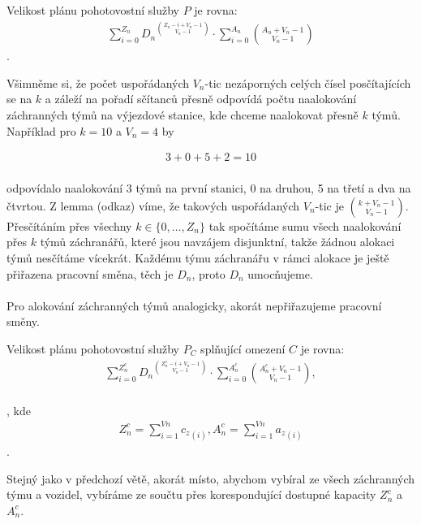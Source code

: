 \begin{veta}
  Velikost plánu pohotovostní služby $P$ je rovna:
  \begin{align}
    \sum_{i = 0}^{Z_n} {D_n}^{\binom{Z_n - i + V_n - 1}{V_n - 1}} \cdot \sum_{i = 0}^{A_n} {\binom{A_n + V_n - 1}{V_n - 1}}
  \end{align}
  .
\end{veta}
\begin{dukaz}
  Všimněme si, že počet uspořádaných $V_n$-tic nezáporných celých čísel posčítajících se na $k$
  a záleží na pořadí sčítanců přesně odpovídá počtu naalokování záchranných týmů na výjezdové stanice, kde chceme naalokovat přesně $k$ týmů.
  Například pro $k = 10$ a $V_n = 4$ by

  \begin{align*}
    3 + 0 + 5 + 2 = 10
    \\
  \end{align*}

  odpovídalo naalokování 3 týmů na první stanici, 0 na druhou, 5 na třetí a dva na čtvrtou.
  Z lemma (odkaz) víme, že takových uspořádaných $V_n$-tic je $\binom{k + V_n - 1}{V_n - 1}$.
  Přesčítáním přes všechny $k \in \{ 0, \dots, Z_n \}$ tak spočítáme sumu všech naalokování přes $k$ týmů záchranářů, které jsou navzájem disjunktní, takže žádnou alokaci týmů nesčítáme vícekrát.
  Každému týmu záchranářu v rámci alokace je ještě přiřazena pracovní směna, těch je $D_n$, proto $D_n$ umocňujeme. 
  \\
  \\
  Pro alokování záchranných týmů analogicky, akorát nepřiřazujeme pracovní směny.

\end{dukaz}

\begin{veta}
  Velikost plánu pohotovostní služby $P_C$ splňující omezení $C$ je rovna:
  \begin{align}
    \sum_{i=0}^{Z^c_n}{{D_n}^{\binom{Z^c_n - i + V_n - 1}{V_n - 1}}} \cdot \sum_{i = 0}^{A^c_n}\binom{A^c_n + V_n - 1}{V_n - 1},
  \end{align}
  \\
  , kde
  \begin{align}
    Z^c_n = \sum_{i=1}^{Vn} {c_z}_{(i)}, A^c_n = \sum_{i=1}^{Vn} {a_z}_{(i)}
  \end{align}
  .
  \\
\end{veta}
\begin{dukaz}
  Stejný jako v předchozí větě, akorát místo, abychom vybíral ze všech záchranných týmu a vozidel, vybíráme ze součtu přes korespondující dostupné kapacity $Z^c_n$ a $A^c_n$.

\end{dukaz}


